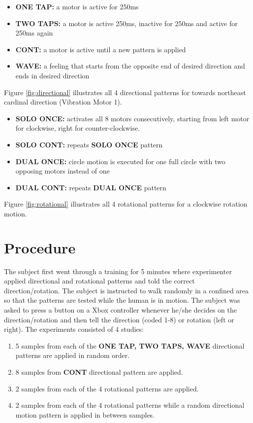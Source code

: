 \begin{itemize}
\item{\textbf{ONE TAP:} a motor is active for 250ms}
\item{\textbf{TWO TAPS:} a motor is active 250ms, inactive for 250ms and active for 250ms again}
\item{\textbf{CONT:} a motor is active until a new pattern is applied}
\item{\textbf{WAVE:} a feeling that starts from the opposite end of desired direction and ends in desired direction}
\end{itemize}

Figure \ref{fig:directional} illustrates all 4 directional patterns for towards northeast cardinal direction (Vibration Motor 1).

\begin{itemize}
\item{\textbf{SOLO ONCE: } activates all 8 motors consecutively, starting from left motor for clockwise, right  for counter-clockwise.}
\item{\textbf{SOLO CONT: } repeats \textbf{SOLO ONCE} pattern}
\item{\textbf{DUAL ONCE: } circle motion is executed for one full circle with two opposing motors instead of one}
\item{\textbf{DUAL CONT: } repeats \textbf{DUAL ONCE} pattern}
\end{itemize}

Figure \ref{fig:rotational} illustrates all 4 rotational patterns for a clockwise rotation motion. 

\section{Procedure}

The subject first went through a training for 5 minutes where experimenter applied directional and rotational patterns and told the correct direction/rotation. The subject is instructed to walk randomly in a confined area so that the patterns are tested while the human is in motion. The subject was asked to press a button on a Xbox controller whenever he/she decides on the direction/rotation and then tell the direction (coded 1-8) or rotation (left or right). The experiments consisted of 4 studies:

\begin{enumerate}
\item 5 samples from each of the \textbf{ONE TAP, TWO TAPS, WAVE} directional patterns are applied in random order. 
\item 8 samples from \textbf{CONT} directional pattern are applied.
\item 2 samples from each of the 4 rotational patterns are applied.
\item 2 samples from each of the 4 rotational patterns while a random directional motion pattern is applied in between samples.
\end{enumerate}



